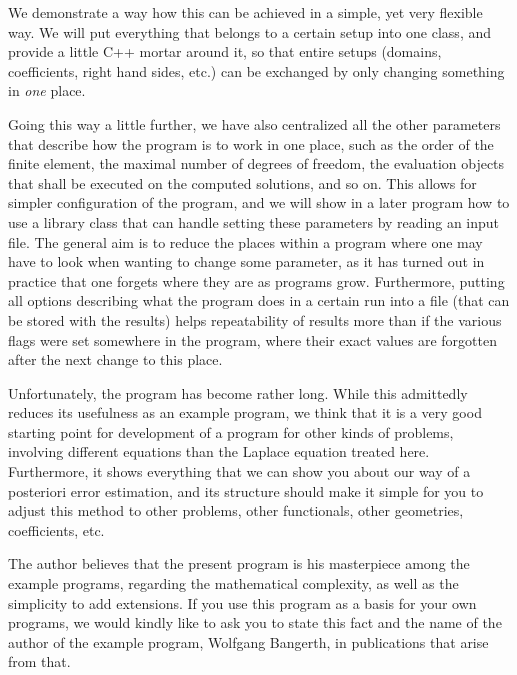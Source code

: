 \documentclass{article}
\begin{document}
We demonstrate a way how this can be achieved in a simple, yet very flexible
way. We will put everything that belongs to a certain setup into one class,
and provide a little C++ mortar around it, so that entire setups (domains,
coefficients, right hand sides, etc.) can be exchanged by only changing
something in \textit{one} place.

Going this way a little further, we have also centralized all the other
parameters that describe how the program is to work in one place, such as the
order of the finite element, the maximal number of degrees of freedom, the
evaluation objects that shall be executed on the computed solutions, and so
on. This allows for simpler configuration of the program, and we will show in
a later program how to use a library class that can handle setting these
parameters by reading an input file. The general aim is to reduce the places
within a program where one may have to look when wanting to change some
parameter, as it has turned out in practice that one forgets where they are as
programs grow. Furthermore, putting all options describing what the program
does in a certain run into a file (that can be stored with the results) helps
repeatability of results more than if the various flags were set somewhere in
the program, where their exact values are forgotten after the next change to
this place.

Unfortunately, the program has become rather long. While this admittedly
reduces its usefulness as an example program, we think that it is a very good
starting point for development of a program for other kinds of problems,
involving different equations than the Laplace equation treated here.
Furthermore, it shows everything that we can show you about our way of a
posteriori error estimation, and its structure should make it simple for you
to adjust this method to other problems, other functionals, other geometries,
coefficients, etc.

The author believes that the present program is his masterpiece among the
example programs, regarding the mathematical complexity, as well as the
simplicity to add extensions. If you use this program as a basis for your own
programs, we would kindly like to ask you to state this fact and the name of
the author of the example program, Wolfgang Bangerth, in publications that
arise from that.



\end{document}

